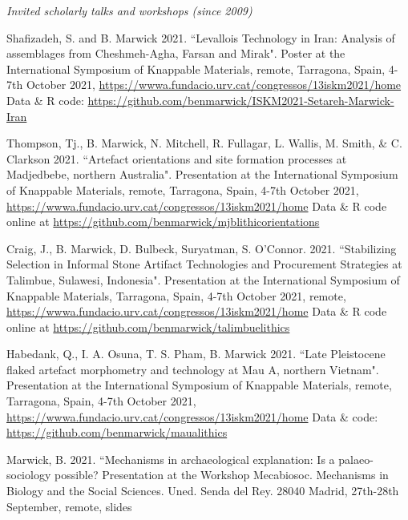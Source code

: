 

\medskip

\noindent\emph{Invited scholarly talks and workshops (since 2009)\vspace{0.01in}}

\medskip

\ind Shafizadeh, S. and B. Marwick 2021. ``Levallois Technology in Iran: Analysis of assemblages from Cheshmeh-Agha, Farsan and Mirak". Poster at the International Symposium of Knappable Materials, remote, Tarragona, Spain, 4-7th October 2021,  \url{https://wwwa.fundacio.urv.cat/congressos/13iskm2021/home}  Data \& R code:  \url{https://github.com/benmarwick/ISKM2021-Setareh-Marwick-Iran}  

\ind Thompson, Tj., B. Marwick, N. Mitchell, R. Fullagar, L. Wallis, M. Smith, \& C. Clarkson 2021. ``Artefact orientations and site formation processes at Madjedbebe, northern Australia". Presentation at the International Symposium of Knappable Materials, remote, Tarragona, Spain, 4-7th October 2021,  \url{https://wwwa.fundacio.urv.cat/congressos/13iskm2021/home}  Data \& R code online at  \url{https://github.com/benmarwick/mjblithicorientations}  

\ind Craig, J., B. Marwick, D. Bulbeck, Suryatman, S. O’Connor. 2021. ``Stabilizing Selection in Informal Stone Artifact Technologies and Procurement Strategies at Talimbue, Sulawesi, Indonesia". Presentation at the International Symposium of Knappable Materials, Tarragona, Spain, 4-7th October 2021, remote,  \url{https://wwwa.fundacio.urv.cat/congressos/13iskm2021/home}  Data \& R code online at   \url{https://github.com/benmarwick/talimbuelithics}     

\ind Habedank, Q., I. A. Osuna, T. S. Pham, B. Marwick 2021. ``Late Pleistocene flaked artefact morphometry and technology at Mau A, northern Vietnam". Presentation at the International Symposium of Knappable Materials, remote, Tarragona, Spain, 4-7th October 2021,  \url{https://wwwa.fundacio.urv.cat/congressos/13iskm2021/home} Data \& code:  \url{https://github.com/benmarwick/maualithics} 

\ind Marwick, B. 2021. ``Mechanisms in archaeological explanation: Is a palaeo-sociology possible?  Presentation at the Workshop Mecabiosoc. Mechanisms in Biology and the Social Sciences. Uned. Senda del Rey. 28040 Madrid, 27th-28th September, remote, slides  


